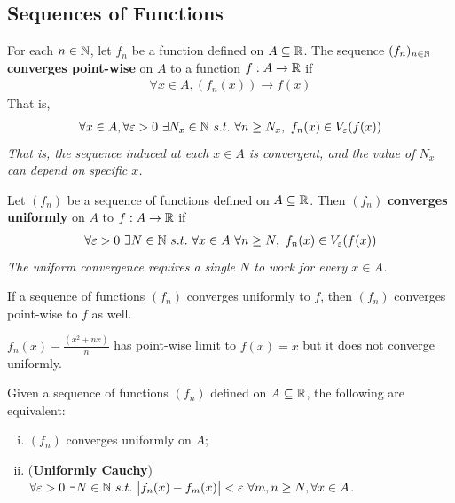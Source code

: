 \documentclass[11pt]{article}
\begin{document}
	\subsection{Sequences of Functions}
	\begin{definition}
		For each $n \in \mathbb{N}$, let $f_n$ be a function defined on $A \subseteq \mathbb{R}$. The sequence $(f_n)_{n \in \mathbb{N}}$ \textbf{converges point-wise} on $A$ to a function $f: A \to \mathbb{R}$ if
		\begin{align}
			\forall x \in A, (f_n(x)) \to f(x)
		\end{align}
		That is,
		\begin{align}
			\forall x \in A,\forall \varepsilon > 0\ \exists N_x \in \mathbb{N}\ s.t.\ \forall n \geq N_x,\ f_n(x) \in V_\varepsilon(f(x))
		\end{align}
		\emph{That is, the sequence induced at each $x \in A$ is convergent, and the value of $N_x$ can depend on specific $x$.}
	\end{definition}
	
	\begin{definition}
		Let $(f_n)$ be a sequence of functions defined on $A \subseteq \mathbb{R}$. Then $(f_n)$ \textbf{converges uniformly} on $A$ to $f: A \to \mathbb{R}$ if 
		\begin{align}
			\forall \varepsilon > 0\ \exists N \in \mathbb{N}\ s.t.\ \forall x \in A\ \forall n \geq N,\ f_n(x) \in V_\varepsilon(f(x))
		\end{align}
		\emph{The uniform convergence requires a single $N$ to work for every $x \in A$.}
	\end{definition}

	\begin{proposition}
		If a sequence of functions $(f_n)$ converges uniformly to $f$, then $(f_n)$ converges point-wise to $f$ as well.
	\end{proposition}
	
	\begin{example}
		$f_n(x) - \frac{(x^2 + nx)}{n}$ has point-wise limit to $f(x) = x$ but it does not converge uniformly.
	\end{example}

	\begin{theorem}
		Given a sequence of functions $(f_n)$ defined on $A \subseteq \mathbb{R}$, the following are equivalent:
		\begin{enumerate}[(i)]
			\item $(f_n)$ converges uniformly on $A$;
			\item (\textbf{Uniformly Cauchy})$\forall \varepsilon > 0\ \exists N \in \N\ s.t.\ \abs{f_n(x) - f_m(x)} < \varepsilon\ \forall m, n \geq N, \forall x \in A$.
		\end{enumerate}
	\end{theorem}
	
\end{document}
